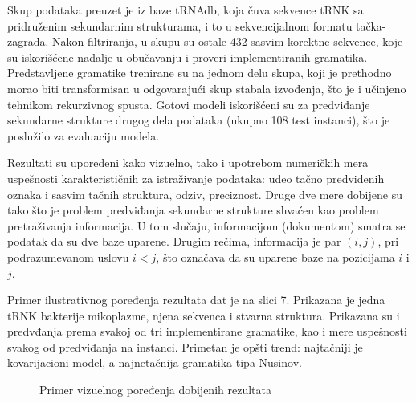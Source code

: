 \documentclass[a4paper, 12pt]{article}
\begin{document}
Skup podataka preuzet je iz baze tRNAdb, koja čuva sekvence tRNK sa pridruženim sekundarnim strukturama, i to u sekvencijalnom formatu tačka-zagrada. Nakon filtriranja, u skupu su ostale 432 sasvim korektne sekvence, koje su iskorišćene nadalje u obučavanju i proveri implementiranih gramatika. Predstavljene gramatike trenirane su na jednom delu skupa, koji je prethodno morao biti transformisan u odgovarajući skup stabala izvođenja, što je i učinjeno tehnikom rekurzivnog spusta. Gotovi modeli iskorišćeni su za predviđanje sekundarne strukture drugog dela podataka (ukupno 108 test instanci), što je poslužilo za evaluaciju modela.

Rezultati su upoređeni kako vizuelno, tako i upotrebom numeričkih mera uspešnosti karakterističnih za istraživanje podataka: udeo tačno predviđenih oznaka i sasvim tačnih struktura, odziv, preciznost. Druge dve mere dobijene su tako što je problem predviđanja sekundarne strukture shvaćen kao problem pretraživanja informacija. U tom slučaju, informacijom (dokumentom) smatra se podatak da su dve baze uparene. Drugim rečima, informacija je par $(i, j)$, pri podrazumevanom uslovu $i < j$, što označava da su uparene baze na pozicijama $i$ i $j$.

Primer ilustrativnog poređenja rezultata dat je na slici 7. Prikazana je jedna tRNK bakterije mikoplazme, njena sekvenca i stvarna struktura. Prikazana su i predvđanja prema svakoj od tri implementirane gramatike, kao i mere uspešnosti svakog od predviđanja na instanci. Primetan je opšti trend: najtačniji je kovarijacioni model, a najnetačnija gramatika tipa Nusinov.

\newpage

\begin{figure}[h!]
    \centering
    \captionsetup{width=0.7\linewidth}
    \vspace{-0.15cm}
    \vspace{0.1cm}
    \caption{Primer vizuelnog poređenja dobijenih rezultata}
\end{figure}
\end{document}
